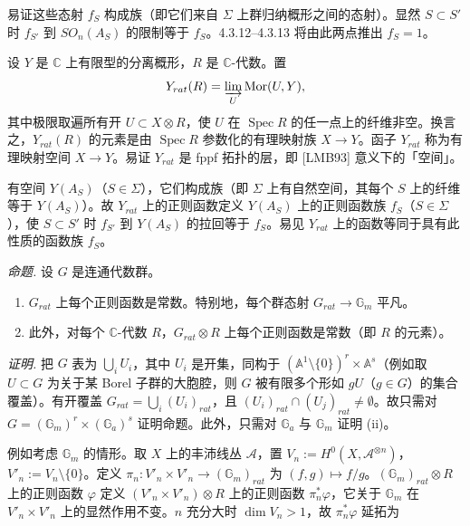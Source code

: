 易证这些态射 $f_{S}$ 构成族（即它们来自 $\Sigma$ 上群归纳概形之间的态射）。显然 $S\subset S'$ 时 $f_{S'}$ 到 $SO_{n}(A_{S})$ 的限制等于 $f_{S}$。4.3.12–4.3.13 将由此两点推出 $f_{S}=1$。

 设 $Y$ 是 $\mathbb{C}$ 上有限型的分离概形，$R$ 是 $\mathbb{C}$-代数。置
\[
Y_{rat}(R)=\varinjlim_{U}\operatorname{Mor}(U,Y),
\]
其中极限取遍所有开 $U\subset X\otimes R$，使 $U$ 在 $\operatorname{Spec} R$ 的任一点上的纤维非空。换言之，$Y_{rat}(R)$ 的元素是由 $\operatorname{Spec} R$ 参数化的有理映射族 $X\to Y$。函子 $Y_{rat}$ 称为有理映射空间 $X\to Y$。易证 $Y_{rat}$ 是 fppf 拓扑的层，即 [LMB93] 意义下的「空间」。

有空间 $Y(A_{S})$（$S\in\Sigma$），它们构成族（即 $\Sigma$ 上有自然空间，其每个 $S$ 上的纤维等于 $Y(A_{S})$）。故 $Y_{rat}$ 上的正则函数定义 $Y(A_{S})$ 上的正则函数族 $f_{S}$（$S\in\Sigma$），使 $S\subset S'$ 时 $f_{S'}$ 到 $Y(A_{S})$ 的拉回等于 $f_{S}$。易见 $Y_{rat}$ 上的函数等同于具有此性质的函数族 $f_{S}$。

 \emph{命题.} 设 $G$ 是连通代数群。
\begin{enumerate}[label=(\roman*),leftmargin=2.2em]
\item $G_{rat}$ 上每个正则函数是常数。特别地，每个群态射 $G_{rat}\to\mathbb{G}_{m}$ 平凡。
\item 此外，对每个 $\mathbb{C}$-代数 $R$，$G_{rat}\otimes R$ 上每个正则函数是常数（即 $R$ 的元素）。
\end{enumerate}

\emph{证明.} 把 $G$ 表为 $\bigcup_{i}U_{i}$，其中 $U_{i}$ 是开集，同构于 $(\mathbb{A}^{1}\setminus\{0\})^{r}\times\mathbb{A}^{s}$（例如取 $U\subset G$ 为关于某 Borel 子群的大胞腔，则 $G$ 被有限多个形如 $gU$（$g\in G$）的集合覆盖）。有开覆盖 $G_{rat}=\bigcup_{i}(U_{i})_{rat}$，且 $(U_{i})_{rat}\cap(U_{j})_{rat}\neq\emptyset$。故只需对 $G=(\mathbb{G}_{m})^{r}\times(\mathbb{G}_{a})^{s}$ 证明命题。此外，只需对 $\mathbb{G}_{a}$ 与 $\mathbb{G}_{m}$ 证明 (ii)。

例如考虑 $\mathbb{G}_{m}$ 的情形。取 $X$ 上的丰沛线丛 $\mathcal{A}$，置 $V_{n}:=H^{0}(X,\mathcal{A}^{\otimes n})$，$V'_{n}:=V_{n}\setminus\{0\}$。定义 $\pi_{n}:V'_{n}\times V'_{n}\to(\mathbb{G}_{m})_{rat}$ 为 $(f,g)\mapsto f/g$。$(\mathbb{G}_{m})_{rat}\otimes R$ 上的正则函数 $\varphi$ 定义 $(V'_{n}\times V'_{n})\otimes R$ 上的正则函数 $\pi_{n}^{*}\varphi$，它关于 $\mathbb{G}_{m}$ 在 $V'_{n}\times V'_{n}$ 上的显然作用不变。$n$ 充分大时 $\dim V_{n}>1$，故 $\pi_{n}^{*}\varphi$ 延拓为

